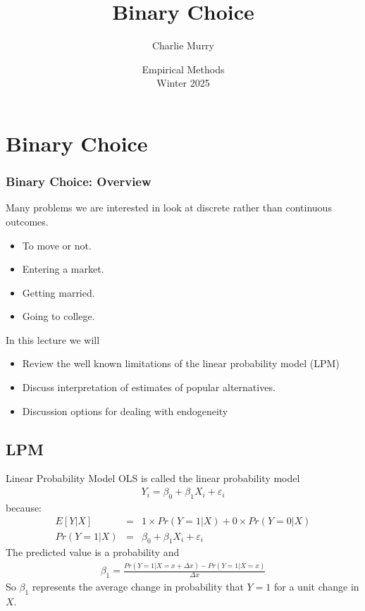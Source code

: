 \documentclass[11pt,dvipsnames,table,aspectratio=169]{beamer}
\title{Binary Choice}
\author{Charlie Murry}
\date{Empirical Methods \\ Winter 2025}
\begin{document}


\begin{frame}
    \titlepage
\end{frame}

\begin{frame}
    \tableofcontents  
\end{frame}

\section{Binary Choice}

\begin{frame}[c]
\frametitle{Binary Choice: Overview}
Many problems we are interested in look at discrete rather than continuous outcomes.
\begin{itemize}
       \item To move or not. 
       \item Entering a market.
       \item Getting married. 
       \item Going to college.
\end{itemize}

\vspace{2em}
In this lecture we will 
\begin{itemize}
\item Review the well known limitations of the linear probability model (LPM)
\item Discuss interpretation of estimates of popular alternatives. 
\item Discussion options for dealing with endogeneity
\end{itemize}
\end{frame}


\subsection{LPM}

\begin{frame}{Linear Probability Model}
       OLS is called the \alert{linear probability model} 
       \begin{eqnarray*}
       Y_i  = \beta_0 + \beta_1 X_i + \varepsilon_i 
       \end{eqnarray*}
       because:
       \begin{eqnarray*}
       E[Y | X] &=& 1 \times Pr(Y=1 | X) + 0 \times Pr(Y=0  | X) \\
       Pr(Y=1 | X) &=& \beta_0 + \beta_1 X_i + \varepsilon_i
       \end{eqnarray*}
       The predicted value is a \alert{probability} and 
       \begin{eqnarray*}
       \beta_1 = \frac{Pr(Y=1 | X =x+\Delta x) - Pr(Y=1 | X=x)}{\Delta x}
       \end{eqnarray*}
       So $\beta_1$ represents the average change in probability that $Y=1$ for a unit change in $X$.
\end{frame}
\end{document}
